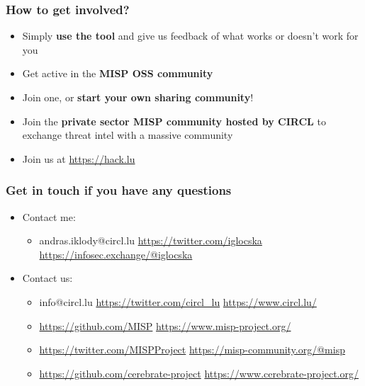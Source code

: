 \begin{frame}
\frametitle{How to get involved?}      
\begin{itemize}
   \item Simply {\bf use the tool} and give us feedback of what works or doesn't work for you
   \item Get active in the {\bf MISP OSS community}
   \item Join one, or {\bf start your own sharing community}!
   \item Join the {\bf private sector MISP community hosted by CIRCL} to exchange threat intel with a massive community
   \item Join us at \url{https://hack.lu}
\end{itemize}
\end{frame}


\begin{frame}
  \frametitle{Get in touch if you have any questions}
  \begin{itemize}
    \item Contact me:
    \begin{itemize}
      \item andras.iklody@circl.lu \url{https://twitter.com/iglocska} \url{https://infosec.exchange/@iglocska}
    \end{itemize}    
    \item Contact us:
    \begin{itemize}
      \item info@circl.lu \url{https://twitter.com/circl_lu} \url{https://www.circl.lu/}
      \item \url{https://github.com/MISP} \url{https://www.misp-project.org/}
      \item \url{https://twitter.com/MISPProject} \url{https://misp-community.org/@misp}
      \item \url{https://github.com/cerebrate-project} \url{https://www.cerebrate-project.org/}
    \end{itemize}
  \end{itemize}
\end{frame}

